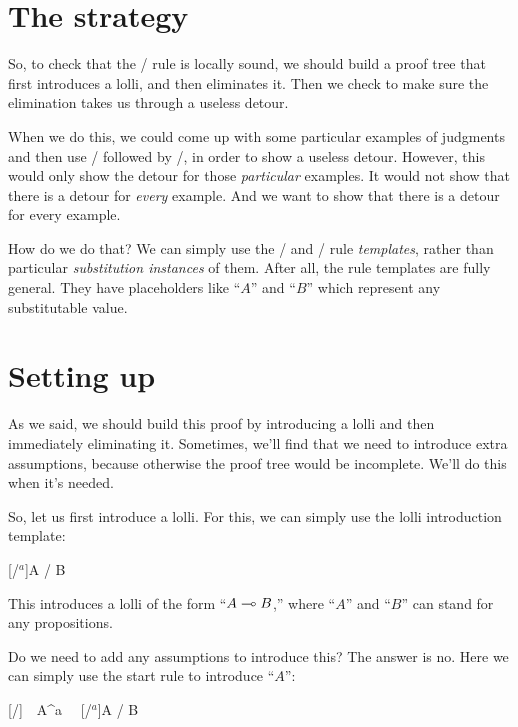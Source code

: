 \documentclass[../../../main.tex]{subfiles}
\begin{document}
\section{The strategy}

So, to check that the \lolliElim/ rule is locally sound, we should build a proof tree that first introduces a lolli, and then eliminates it. Then we check to make sure the elimination takes us through a useless detour.

When we do this, we could come up with some particular examples of judgments and then use \lolliIntro/ followed by \lolliElim/, in order to show a useless detour. However, this would only show the detour for those \emph{particular} examples. It would not show that there is a detour for \emph{every} example. And we want to show that there is a detour for every example. 

How do we do that? We can simply use the \lolliIntro/ and \lolliElim/ rule \emph{templates}, rather than particular \emph{substitution instances} of them. After all, the rule templates are fully general. They have placeholders like ``$A$'' and ``$B$'' which represent any substitutable value.


\section{Setting up}

As we said, we should build this proof by introducing a lolli and then immediately eliminating it. Sometimes, we'll find that we need to introduce extra assumptions, because otherwise the proof tree would be incomplete. We'll do this when it's needed.

So, let us first introduce a lolli. For this, we can simply use the lolli introduction template:

\begin{prooftree*}
  \ellipsis{}{}
  [\lolliIntro/$^{a}$]{A \lolli/ B}
\end{prooftree*}

\noindent
This introduces a lolli of the form ``$A \lolli/ B$,'' where ``$A$'' and ``$B$'' can stand for any propositions. 

Do we need to add any assumptions to introduce this? The answer is no. Here we can simply use the start rule to introduce ``$A$'':

\begin{prooftree*}
  \hypo{}
  [\startrule/]{~~A^{a}~~}
  \ellipsis{}{}
  [\lolliIntro/$^{a}$]{A \lolli/ B}
\end{prooftree*}
\end{document}
